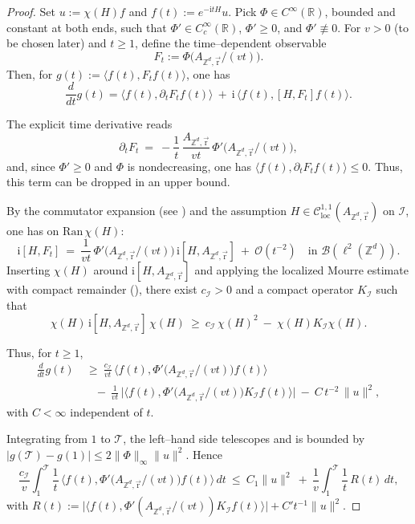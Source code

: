 \documentclass[10pt]{amsart} %
\newcommand{\1}{{\mathbb{I}}}
\numberwithin{equation}{section}
\begin{document}
\begin{proof}
Set $u:=\chi(H)f$ and $f(t):=e^{-\mathrm{i}tH}u$.
Pick $\Phi\in C^\infty(\mathbb{R})$, bounded and constant at both ends, such that
\(\Phi'\in C_c^\infty(\mathbb{R})\), $\Phi'\ge0$, and $\Phi'\not\equiv0$.
For $v>0$ (to be chosen later) and $t\ge1$, define the time–dependent observable
\[
F_t := \Phi\!\big(A_{\mathbb{Z}^d,\vec{\mathrm{r}}}/(vt)\big).
\]
Then, for $g(t):=\langle f(t),F_t f(t)\rangle$, one has
\[
\frac{d}{dt}g(t) = \big\langle f(t),\partial_t F_t f(t)\big\rangle \ +\ \mathrm{i}\,\big\langle f(t),[H,F_t] f(t)\big\rangle.
\]

The explicit time derivative reads
\[
\partial_t F_t \ =\ -\frac{1}{t}\,\frac{A_{\mathbb{Z}^d,\vec{\mathrm{r}}}}{vt}\,\Phi'\!\big(A_{\mathbb{Z}^d,\vec{\mathrm{r}}}/(vt)\big),
\]
and, since $\Phi'\ge0$ and $\Phi$ is nondecreasing, one has
\(\langle f(t),\partial_t F_t f(t)\rangle\le0\).
Thus, this term can be dropped in an upper bound.

By the commutator expansion (see \cite[Prop.~6.2.10]{ABG}) and the assumption
\(H\in\mathcal{C}^{1,1}_{\mathrm{loc}}(A_{\mathbb{Z}^d,\vec{\mathrm{r}}})\) on $\mathcal{I}$, one has on $\mathrm{Ran}\,\chi(H)$:
\[
\mathrm{i}[H,F_t] \ =\ \frac{1}{vt}\,\Phi'\!\big(A_{\mathbb{Z}^d,\vec{\mathrm{r}}}/(vt)\big)\,\mathrm{i}[H,A_{\mathbb{Z}^d,\vec{\mathrm{r}}}] \ +\ \mathcal{O}(t^{-2})
\quad\text{in }\mathcal{B}(\ell^2(\mathbb{Z}^d)).
\]
Inserting $\chi(H)$ around $\mathrm{i}[H,A_{\mathbb{Z}^d,\vec{\mathrm{r}}}]$ and applying the localized Mourre estimate with compact remainder (\cite[Thm.~7.2.9]{ABG}), there exist $c_{\mathcal{I}}>0$ and a compact operator $K_{\mathcal{I}}$ such that
\[
\chi(H)\,\mathrm{i}[H,A_{\mathbb{Z}^d,\vec{\mathrm{r}}}]\,\chi(H)\ \ge\ c_{\mathcal{I}}\,\chi(H)^2\ -\ \chi(H)K_{\mathcal{I}}\chi(H).
\]

Thus, for $t\ge1$,
\begin{align*}
\frac{d}{dt}g(t)
&\ \ge\ \frac{c_{\mathcal{I}}}{vt}\,\big\langle f(t),\Phi'\!\big(A_{\mathbb{Z}^d,\vec{\mathrm{r}}}/(vt)\big) f(t)\big\rangle \\
&\quad -\ \frac{1}{vt}\,\big|\big\langle f(t),\Phi'\!\big(A_{\mathbb{Z}^d,\vec{\mathrm{r}}}/(vt)\big)K_{\mathcal{I}} f(t)\big\rangle\big|
\ -\ C\,t^{-2}\,\|u\|^2,
\end{align*}
with $C<\infty$ independent of $t$.

Integrating from $1$ to $\mathcal{T}$, the left–hand side telescopes and is bounded by
\(|g(\mathcal{T})-g(1)|\le 2\|\Phi\|_\infty\|u\|^2\). Hence
\begin{equation}\label{eq:int-ineq-en}
\frac{c_{\mathcal{I}}}{v}\int_1^{\mathcal{T}}\frac{1}{t}\,\big\langle f(t),\Phi'\!\big(A_{\mathbb{Z}^d,\vec{\mathrm{r}}}/(vt)\big) f(t)\big\rangle\,dt
\ \le\ C_1\|u\|^2\ +\ \frac{1}{v}\int_1^{\mathcal{T}}\frac{1}{t}\,R(t)\,dt,
\end{equation}
with
\(R(t):=\big|\langle f(t),\Phi'(A_{\mathbb{Z}^d,\vec{\mathrm{r}}}/(vt))K_{\mathcal{I}} f(t)\rangle\big|+ C't^{-1}\|u\|^2\).


\end{proof}
\end{document}
